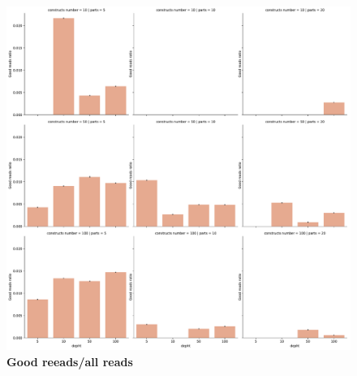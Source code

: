 \documentclass[11pt, a4paper]{article}
\begin{document}
\begin{figure}[ht]
    \begin{center}
    \includegraphics[width=1\textwidth]{../results/images_notebook/v_312/good_reads_ratio.pdf}
    \end{center}
    \caption{{\bf Good reeads/all reads }}
   \label{fig:v_312_good_reads_ratio}
\end{figure}
\end{document}
